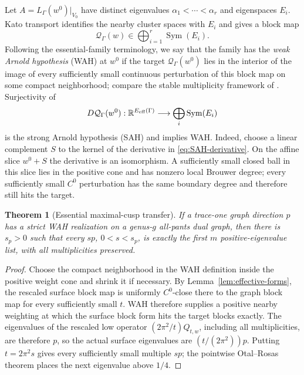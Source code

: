 \documentclass[11pt,reqno]{amsart}
\newtheorem{theorem}{Theorem}[section]
\theoremstyle{definition}
\theoremstyle{remark}
\newcommand{\R}{\mathbb R}
\newcommand{\Sym}{\operatorname{Sym}}
\begin{document}
Let $A=L_\Gamma(w^0)|_{V_0}$ have distinct eigenvalues
$\alpha_1<\cdots<\alpha_r$ and eigenspaces $E_i$.  Kato transport identifies
the nearby cluster spaces with $E_i$ and gives a block map
\[
 \mathcal Q_\Gamma(w)\in\bigoplus_{i=1}^r\Sym(E_i).
\]
Following the essential-family terminology, we say that the family has the
\emph{weak Arnold hypothesis} (WAH) at $w^0$ if the target
$\mathcal Q_\Gamma(w^0)$ lies in the interior of the image of every
sufficiently small continuous perturbation of this block map on some compact
neighborhood; compare the stable multiplicity framework of
\cite{CdVArnold1988}.  Surjectivity of
\begin{equation}\label{eq:SAH-derivative}
 D\mathcal Q_\Gamma(w^0):\R^{E_{\rm eff}(\Gamma)}
 \longrightarrow\bigoplus_i\Sym(E_i)
\end{equation}
is the strong Arnold hypothesis (SAH) and implies WAH.
Indeed, choose a linear complement $S$ to the kernel of the derivative in
\eqref{eq:SAH-derivative}.  On the affine slice $w^0+S$ the derivative is an
isomorphism.  A sufficiently small closed ball in this slice lies in the
positive cone and has nonzero local Brouwer degree; every sufficiently small
$C^0$ perturbation has the same boundary degree and therefore still hits the
target.

\begin{theorem}[Essential maximal-cusp transfer]
\label{thm:essential-transfer}
If a trace-one graph direction $p$ has a strict WAH realization on a
genus-$g$ all-pants dual graph, then there is $s_p>0$ such that every $sp$,
$0<s<s_p$, is exactly the first $m$ positive-eigenvalue list, with all
multiplicities preserved.
\end{theorem}

\begin{proof}
Choose the compact neighborhood in the WAH definition inside the positive
weight cone and shrink it if necessary.  By
Lemma~\ref{lem:effective-forms}, the rescaled surface block map is uniformly
$C^0$-close there to the graph block map for every sufficiently small $t$.
WAH therefore supplies a positive nearby weighting at which the surface
block form hits the target blocks exactly.  The eigenvalues of the rescaled
low operator $(2\pi^2/t)Q_{t,w}$, including all multiplicities, are therefore
$p$, so the actual surface eigenvalues are $(t/(2\pi^2))p$.  Putting
$t=2\pi^2s$ gives every sufficiently small multiple $sp$; the pointwise
Otal--Rosas theorem places the next eigenvalue above $1/4$.
\end{proof}
\end{document}
